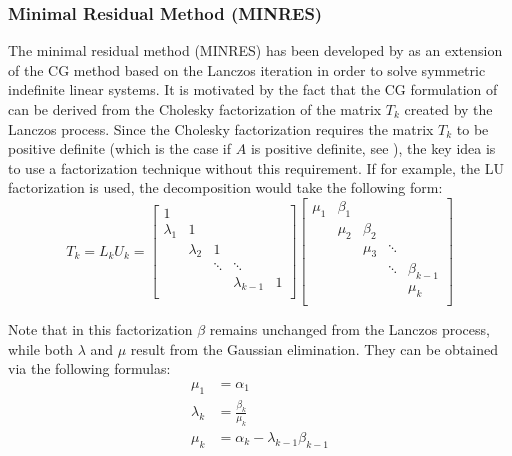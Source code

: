 \subsubsection{Minimal Residual Method (MINRES)}
\label{sec:minres}
The minimal residual method (MINRES) has been developed by \cite{paige_solution_1975} as an extension of the CG method based on the Lanczos iteration in order to solve symmetric indefinite linear systems. It is motivated by the fact that the CG formulation of \cite{hestenes_methods_1952} can be derived from the Cholesky factorization of the matrix $T_k$ created by the Lanczos process. Since the Cholesky factorization requires the matrix $T_k$ to be positive definite (which is the case if $A$ is positive definite, see \cite{paige_solution_1975}), the key idea is to use a factorization technique without this requirement. If for example, the LU factorization is used, the decomposition would take the following form:
\begin{equation}
       T_k = L_k U_k=
  \left[
    \begin{array}{ccccc}
      1 &  & & & \\
      \lambda_1 & 1 &  & & \\
      & \lambda_2 & 1 &  & \\
       & &\ddots &\ddots & \\
       & & &\lambda_{k-1} &1 \\
    \end{array}
  \right] 
  \left[
    \begin{array}{ccccc}
      \mu_1 & \beta_1 & & & \\
       & \mu_2 & \beta_2  & & \\
      &  & \mu_3 & \ddots  & \\
       & & &\ddots &\beta_{k-1} \\
       & & & &\mu_{k} \\
    \end{array}
  \right] 
\end{equation}

\noindent Note that in this factorization $\beta$ remains unchanged from the Lanczos process, while both $\lambda$ and $\mu$ result from the Gaussian elimination. They can be obtained via the following formulas:
\begin{equation}
    \begin{aligned}
    \mu_1 &= \alpha_1\\
    \lambda_k &= \frac{\beta_k}{\mu_{k}} \\
      \mu_k & = \alpha_k-\lambda_{k-1}\beta_{k-1}
    \end{aligned}
\end{equation}

